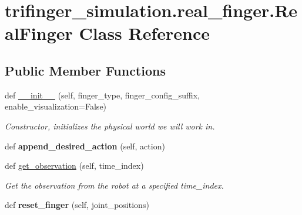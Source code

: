 \hypertarget{classtrifinger__simulation_1_1real__finger_1_1RealFinger}{}\section{trifinger\+\_\+simulation.\+real\+\_\+finger.\+Real\+Finger Class Reference}
\label{classtrifinger__simulation_1_1real__finger_1_1RealFinger}
\subsection*{Public Member Functions}
\begin{DoxyCompactItemize}
\item 
def \hyperlink{classtrifinger__simulation_1_1real__finger_1_1RealFinger_ac439b679344398a9ea05e8dbe2b4d9e4}{\+\_\+\+\_\+init\+\_\+\+\_\+} (self, finger\+\_\+type, finger\+\_\+config\+\_\+suffix, enable\+\_\+visualization=False)
\begin{DoxyCompactList}\small\item\em Constructor, initializes the physical world we will work in. \end{DoxyCompactList}\item 
\mbox{\label{classtrifinger__simulation_1_1real__finger_1_1RealFinger_a88c73a72ad0f45cb379bc72394183fbf}} 
def {\bfseries append\+\_\+desired\+\_\+action} (self, action)
\item 
def \hyperlink{classtrifinger__simulation_1_1real__finger_1_1RealFinger_a5e10f8a9627376f072ad2ea64ecdd361}{get\+\_\+observation} (self, time\+\_\+index)
\begin{DoxyCompactList}\small\item\em Get the observation from the robot at a specified time\+\_\+index. \end{DoxyCompactList}\item 
\mbox{\label{classtrifinger__simulation_1_1real__finger_1_1RealFinger_ac6d714de5c42486c3bfbc745c8370a6f}} 
def {\bfseries reset\+\_\+finger} (self, joint\+\_\+positions)
\end{DoxyCompactItemize}
